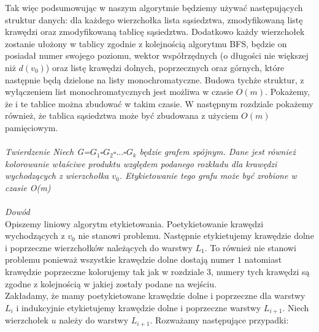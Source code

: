 \documentclass[12pt,a4paper,titlepage]{article}
\begin{document}
Tak więc podsumowując w naszym algorytmie będziemy używać następujących struktur danych: dla każdego wierzchołka lista sąsiedztwa, zmodyfikowaną listę krawędzi oraz zmodyfikowaną tablicę sąsiedztwa. Dodatkowo każdy wierzchołek zostanie ułożony w tablicy zgodnie z kolejnością algorytmu BFS, będzie on posiadał numer swojego poziomu, wektor współrzędnych (o długości nie większej niż $d(v_0)$) oraz listę krawędzi dolnych, poprzecznych oraz górnych, które następnie będą dzielone na listy monochromatyczne. Budowa tychże struktur, z wyłączeniem list monochromatycznych jest możliwa w czasie $O(m)$. Pokażemy, że i te tablice można zbudować w takim czasie. W następnym rozdziale pokażemy również, że tablica sąsiedztwa może być zbudowana z użyciem $O(m)$ pamięciowym. \\
\\
\textit{Twierdzenie Niech G=$G_1 \square G_2 \square ... \square G_k$ będzie grafem spójnym. Dane jest również kolorowanie właściwe produktu względem podanego rozkładu dla krawędzi wychodzących z wierzchołka $v_0$. Etykietowanie tego grafu może być zrobione w czasie O(m)}\\
\\
\textit{Dowód}\\
Opiszemy liniowy algorytm etykietowania. Poetykietowanie krawędzi wychodzących z $v_0$ nie stanowi problemu. Następnie etykietujemy krawędzie dolne i poprzeczne wierzchołków należących do warstwy $L_1$. To również nie stanowi problemu ponieważ wszystkie krawędzie dolne dostają numer $1$ natomiast krawędzie poprzeczne kolorujemy tak jak w rozdziale 3, numery tych krawędzi są zgodne z kolejnością w jakiej zostały podane na wejściu. \\
Zakładamy, że mamy poetykietowane krawędzie dolne i poprzeczne dla warstwy $L_i$ i indukcyjnie etykietujemy krawędzie dolne i poprzeczne warstwy $L_{i+1}$. Niech wierzchołek $u$ należy do warstwy $L_{i+1}$. Rozważamy następujące przypadki:\\
\end{document}
